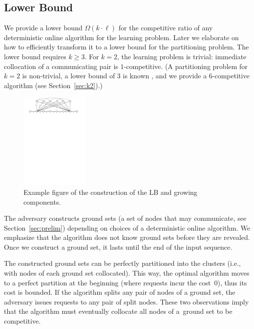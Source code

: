 \documentclass[manuscript,screen=true, review, anonymous]{acmart}
\begin{document}
\subsection{Lower Bound}

\label{sec:lowerbound}


We provide a lower bound $\Omega(k\cdot \ell)$ for the competitive ratio of any deterministic online algorithm for the learning problem.
Later we elaborate on how to efficiently transform it to a lower bound for the partitioning problem.
The lower bound requires $k\geq 3$.
For $k=2$, the learning problem is trivial: immediate collocation of a communicating pair is $1$-competitive.
(A partitioning problem for $k=2$ is non-trivial, a lower bound of $3$ is known \cite{repartition-disc}, and we provide a $6$-competitive algorithm (see Section~\ref{sec:k2}).)




\begin{figure}[H]
	\centering
	\includegraphics[width=0.3\textwidth]{figs/substitute}
	\caption{Example figure of the construction of the LB and growing components.}
	\label{fig:nptree-construction}
\end{figure}


The adversary constructs ground sets (a set of nodes that may communicate, see Section~\ref{sec:prelim}) depending on choices of a deterministic online algorithm.
We emphasize that the algorithm does not know ground sets before they are revealed.
Once we construct a ground set, it lasts until the end of the input sequence.

The constructed ground sets can be perfectly partitioned into the clusters (i.e., with nodes of each ground set collocated).
This way, the optimal algorithm moves to a perfect partition at the beginning (where requests incur the cost~$0$), thus its cost is bounded.
If the algorithm splits any pair of nodes of a ground set, the adversary issues requests to any pair of split nodes.
These two observations imply that the algorithm must eventually collocate all nodes of a~ground set to be competitive.
\end{document}
